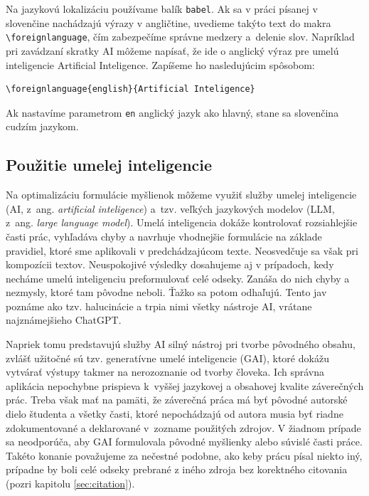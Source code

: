 Na jazykovú lokalizáciu používame balík \verb|babel|.
Ak sa v práci písanej v slovenčine nachádzajú výrazy v angličtine,
uvedieme takýto text do makra \verb|\foreignlanguage|, čím zabezpečíme správne medzery a~delenie slov.
Napríklad pri zavádzaní skratky AI môžeme napísať, že ide o anglický výraz pre umelú inteligencie \foreignlanguage{english}{Artificial Inteligence}.
Zapíšeme ho nasledujúcim spôsobom:
\begin{verbatim}
\foreignlanguage{english}{Artificial Inteligence}
\end{verbatim}

Ak nastavíme parametrom \verb|en| anglický jazyk ako hlavný, stane sa slovenčina cudzím jazykom.

\subsection{Použitie umelej inteligencie}\label{sec:utilizingAI}
Na optimalizáciu formulácie myšlienok môžeme využiť služby
umelej inteligencie (AI, z~ang. \emph{\foreignlanguage{english}{artificial inteligence}}) a~tzv. veľkých jazykových modelov (LLM, z~ang. \emph{\foreignlanguage{english}{large language model}}). 
Umelá inteligencia dokáže kontrolovať rozsiahlejšie časti prác, 
vyhľadáva chyby a navrhuje vhodnejšie
formulácie na základe pravidiel,
ktoré sme aplikovali v predchádzajúcom texte.
Neosvedčuje sa však pri kompozícii textov.
Neuspokojivé výsledky dosahujeme aj v prípadoch,
kedy necháme umelú inteligenciu preformulovať celé odseky.
Zanáša do nich chyby a nezmysly, ktoré tam pôvodne neboli.
Ťažko sa potom odhaľujú.
Tento jav poznáme ako tzv.
halucinácie a trpia nimi všetky nástroje AI,
vrátane najznámejšieho ChatGPT.

Napriek tomu predstavujú služby AI silný nástroj pri tvorbe pôvodného obsahu, zvlášť užitočné sú tzv. generatívne umelé inteligencie (GAI),
ktoré dokážu vytvárať výstupy takmer na nerozoznanie od tvorby človeka.
Ich správna aplikácia nepochybne prispieva k~vyššej jazykovej a obsahovej kvalite záverečných prác.
Treba však mať na pamäti, že záverečná práca má byť 
pôvodné autorské dielo študenta a všetky časti, 
ktoré nepochádzajú od autora musia byť riadne 
zdokumentované a deklarované v~zozname použitých zdrojov.
V žiadnom prípade sa neodporúča, aby
GAI formulovala pôvodné myšlienky
alebo súvislé časti práce.
Takéto konanie považujeme za nečestné podobne,
ako keby prácu písal niekto iný,
prípadne by boli celé odseky prebrané z iného zdroja bez korektného citovania (pozri kapitolu \ref{sec:citation}).

